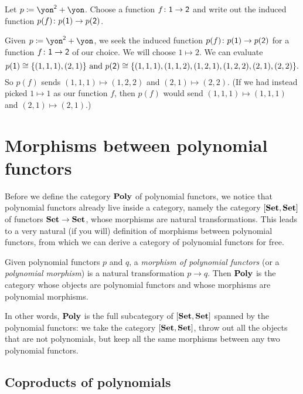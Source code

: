 \documentclass[Book-Poly]{subfiles}
\begin{document}
\begin{exercise}
Let $p\coloneqq\yon^\2+\yon$. Choose a function $f\colon\textsf{1}\to\textsf{2}$ and write out the induced function $p(f)\colon p(\textsf{1})\to p(\textsf{2})$.
\begin{solution}
Given $p\coloneqq\yon^\2+\yon$, we seek the induced function $p(f)\colon p(\textsf{1})\to p(\textsf{2})$ for a function $f\colon\textsf{1}\to\textsf{2}$ of our choice.
We will choose $1 \mapsto 2$.
We can evaluate
\[
    p(\textsf{1}) \cong \{(1, 1, 1), (2, 1)\} \text{ and } p(\textsf{2}) \cong \{(1, 1, 1), (1, 1, 2), (1, 2, 1), (1, 2, 2), (2, 1), (2, 2)\}.
\]
So $p(f)$ sends $(1, 1, 1) \mapsto (1, 2, 2)$ and $(2, 1) \mapsto (2, 2)$.
(If we had instead picked $1 \mapsto 1$ as our function $f$, then $p(f)$ would send $(1, 1, 1) \mapsto (1, 1, 1)$ and $(2, 1) \mapsto (2, 1)$.)
\end{solution}
\end{exercise}


\section{Morphisms between polynomial functors}
\label{sec.poly.func_nat.morph}

Before we define the category $\mathbf{Poly}$ of polynomial functors, we notice that polynomial functors already live inside a category, namely the category $[\mathbf{Set},\mathbf{Set}]$ of functors $\mathbf{Set} \to \mathbf{Set}$, whose morphisms are natural transformations.
This leads to a very natural (if you will) definition of morphisms between polynomial functors, from which we can derive a category of polynomial functors for free.

\begin{definition} \label{def.poly_cat}
Given polynomial functors $p$ and $q$, a \emph{morphism of polynomial functors} (or a \emph{polynomial morphism}) is a natural transformation $p\to q$.
Then $\mathbf{Poly}$ is the category whose objects are polynomial functors and whose morphisms are polynomial morphisms.
\end{definition}

In other words, $\mathbf{Poly}$ is the full subcategory of $[\mathbf{Set},\mathbf{Set}]$ spanned by the polynomial functors: we take the category $[\mathbf{Set},\mathbf{Set}]$, throw out all the objects that are not polynomials, but keep all the same morphisms between any two polynomial functors.

\subsection{Coproducts of polynomials}
\label{subsec.poly.func_nat.morph.coprod}
\end{document}
